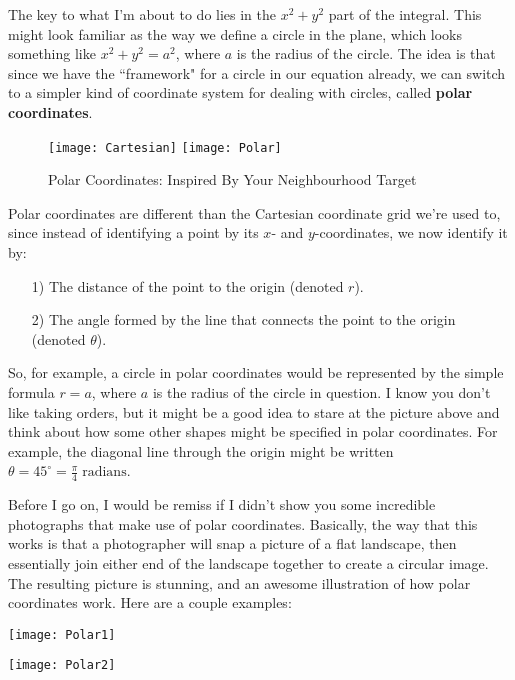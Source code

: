 \documentclass[11pt,titlepage]{article}
\begin{document}
The key to what I'm about to do lies in the $x^2 + y^2$ part of the integral. This might look familiar as the way we define a circle in the plane, which looks something like $x^2 + y^2 = a^2$, where $a$ is the radius of the circle. The idea is that since we have the ``framework" for a circle in our equation already, we can switch to a simpler kind of coordinate system for dealing with circles, called \textbf{polar coordinates}. 
\newpage
\begin{figure}[h]
\begin{center}
\texttt{[image: Cartesian]}
\Large{}
\texttt{[image: Polar]}
\caption{Polar Coordinates: Inspired By Your Neighbourhood Target}
\end{center}
\end{figure}

Polar coordinates are different than the Cartesian coordinate grid we're used to, since instead of identifying a point by its $x$- and $y$-coordinates, we now identify it by:\vspace{-0.2cm}
\begin{enumerate}
\item[1)] The distance of the point to the origin (denoted $r$).\vspace{-0.3cm}
\item[2)] The angle formed by the line that connects the point to the origin (denoted $\theta$). 
\end{enumerate}

So, for example, a circle in polar coordinates would be represented by the simple formula $r = a$, where $a$ is the radius of the circle in question. I know you don't like taking orders, but it might be a good idea to stare at the picture above and think about how some other shapes might be specified in polar coordinates. For example, the diagonal line through the origin might be written $\theta = 45^{\circ} = \frac{\pi}{4}\;\text{radians}$. 

Before I go on, I would be remiss if I didn't show you some incredible photographs that make use of polar coordinates. Basically, the way that this works is that a photographer will snap a picture of a flat landscape, then essentially join either end of the landscape together to create a circular image. The resulting picture is stunning, and an awesome illustration of how polar coordinates work. Here are a couple examples:\\

\begin{minipage}{0.5\textwidth}
\texttt{[image: Polar1]}
\end{minipage}
\begin{minipage}{0.5\textwidth}
\texttt{[image: Polar2]} \\
\end{minipage}
\end{document}
